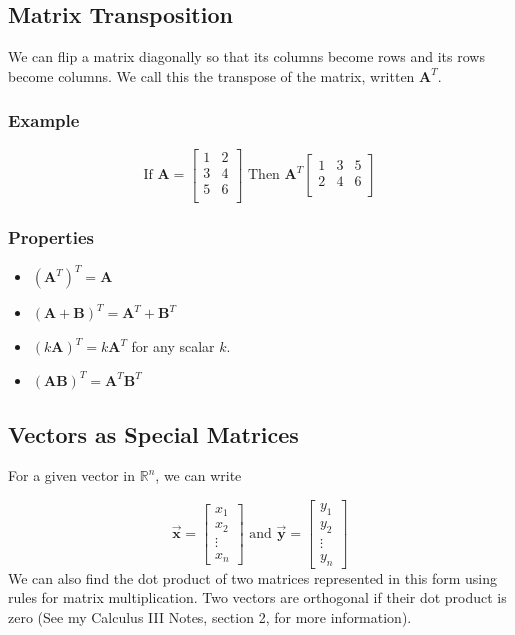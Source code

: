 \documentclass[12pt, landscape, twocolumn]{article}
\newcommand{\ma}[0]{\mathbf{A} }        %
\newcommand{\mb}[0]{\mathbf{B} }        %
\let\oldvec\vec
\renewcommand{\vec}[1]{\oldvec{\mathbf{ #1 } } }                    %
\begin{document}
    \subsection{Matrix Transposition}
    We can flip a matrix diagonally so that its columns become rows and its rows become columns. We call this the transpose of the matrix, written $\mathbf{A}^T$.

        \subsubsection{Example}
        \[
        \text{If } \mathbf{A} = \left[ \begin{array}{cc}
            1 & 2\\
            3 & 4\\
            5 & 6\\
        \end{array} \right] \text{ Then } \mathbf{A}^T
        \left[ \begin{array}{ccc}
            1 & 3 & 5\\
            2 & 4 & 6\\
        \end{array} \right]
        \]

        \subsubsection{Properties}
        \begin{itemize}
            \item ${(\ma^T)}^T = \ma$
            \item ${(\ma + \mb)}^T = \ma^T + \mb^T$
            \item ${(k \ma)}^T = k\ma^T$ for any scalar $k$.
            \item ${(\ma \mb)}^T = \ma^T \mb^T$
        \end{itemize}

    \subsection{Vectors as Special Matrices}
    For a given vector in $\mathbb{R}^n$, we can write

    \[
        \vec{x} =
        \left[\begin{matrix}
        x_1\\
        x_2\\
        \vdots\\
        x_n
        \end{matrix}\right] \text{ and }
        \vec{y} =
        \left[\begin{matrix}
        y_1\\
        y_2\\
        \vdots\\
        y_n
        \end{matrix}\right]
    \]
    We can also find the dot product of two matrices represented in this form using rules for matrix multiplication. Two vectors are orthogonal if their dot product is zero (See my Calculus III Notes, section 2, for more information).
\end{document}
